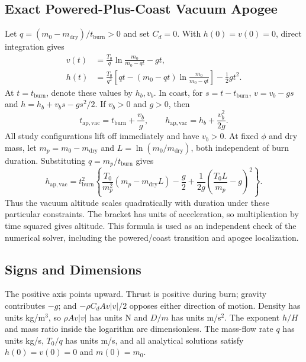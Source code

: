\documentclass{article}
\begin{document}
\subsection{Exact Powered-Plus-Coast Vacuum Apogee}
\label{app:vacuum}
Let $q=(m_0-m_{\mathrm{dry}})/t_{\mathrm{burn}}>0$ and set $C_d=0$. With $h(0)=v(0)=0$, direct integration gives
\begin{align*}
 v(t)&=\frac{T_0}{q}\ln\frac{m_0}{m_0-qt}-gt,\\
 h(t)&=\frac{T_0}{q^2}\left[qt-(m_0-qt)\ln\frac{m_0}{m_0-qt}\right]-\frac12gt^2.
\end{align*}
At $t=t_{\mathrm{burn}}$, denote these values by $h_b,v_b$. In coast, for $s=t-t_{\mathrm{burn}}$, $v=v_b-gs$ and $h=h_b+v_bs-gs^2/2$. If $v_b>0$ and $g>0$, then
\[
 t_{\mathrm{ap,vac}}=t_{\mathrm{burn}}+\frac{v_b}{g},\qquad
 h_{\mathrm{ap,vac}}=h_b+\frac{v_b^2}{2g}.
\]
All study configurations lift off immediately and have $v_b>0$. At fixed $\phi$ and dry mass, let $m_p=m_0-m_{\mathrm{dry}}$ and $L=\ln(m_0/m_{\mathrm{dry}})$, both independent of burn duration. Substituting $q=m_p/t_{\mathrm{burn}}$ gives
\[
 h_{\mathrm{ap,vac}}=t_{\mathrm{burn}}^2
 \left\{\frac{T_0}{m_p^2}(m_p-m_{\mathrm{dry}}L)-\frac{g}{2}
 +\frac{1}{2g}\left(\frac{T_0L}{m_p}-g\right)^2\right\}.
\]
Thus the vacuum altitude scales quadratically with duration under these particular constraints. The bracket has units of acceleration, so multiplication by time squared gives altitude. This formula is used as an independent check of the numerical solver, including the powered/coast transition and apogee localization.

\subsection{Signs and Dimensions}
The positive axis points upward. Thrust is positive during burn; gravity contributes $-g$; and $-\rho C_d A v|v|/2$ opposes either direction of motion. Density has units kg/m$^3$, so $\rho A v|v|$ has units N and $D/m$ has units m/s$^2$. The exponent $h/H$ and mass ratio inside the logarithm are dimensionless. The mass-flow rate $q$ has units kg/s, $T_0/q$ has units m/s, and all analytical solutions satisfy $h(0)=v(0)=0$ and $m(0)=m_0$.
\end{document}
